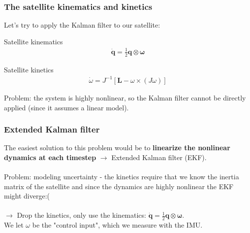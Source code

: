 \documentclass{beamer}
\begin{document}
\begin{frame}
    \frametitle{The satellite kinematics and kinetics}
    Let's try to apply the Kalman filter to our satellite:
    \begin{block}{Satellite kinematics}
        \begin{equation}
            \begin{aligned}
                \dot{\mathbf{q}}=\frac{1}{2} \mathbf{q} \otimes \boldsymbol{\omega}
            \end{aligned}
        \end{equation}
    \end{block}
    \begin{block}{Satellite kinetics}
        \begin{equation}
            \begin{aligned}
                \dot{\omega}=J^{-1}\left[\mathbf{L}-\omega \times\left(J \omega\right)\right]
            \end{aligned}
        \end{equation}
    \end{block}
    Problem: the system is highly nonlinear, so the Kalman filter cannot be directly applied (since it assumes a linear model).
\end{frame}


\begin{frame}
    \frametitle{Extended Kalman filter}
    The easiest solution to this problem would be to \textbf{linearize the nonlinear dynamics at each timestep} $\rightarrow$ Extended Kalman filter (EKF). \\~\\

    Problem: modeling uncertainty - the kinetics require that we know the inertia matrix of the satellite and since the dynamics are highly nonlinear the EKF might diverge:( \\~\\

    $\rightarrow$ Drop the kinetics, only use the kinematics: $\dot{\mathbf{q}}=\frac{1}{2} \mathbf{q} \otimes \boldsymbol{\omega}$. \\
    We let $\omega$ be the "control input", which we measure with the IMU. \\~\\
\end{frame}

\end{document}
